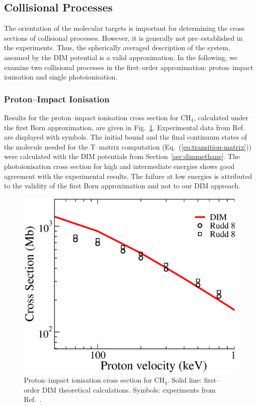 \documentclass[10pt]{article}
\begin{document}
\subsection{Collisional Processes}

The orientation of the molecular targets is important for determining
the cross sections of collisional processes. However, it is generally not 
pre--established in the experiments. Thus, the spherically averaged 
description of the system, 
assumed by the DIM potential is a valid approximation. In the 
following, we examine two collisional processes in the first--order 
approximation: proton--impact ionisation 
and single photoionisation. 

\subsubsection{Proton--Impact Ionisation}

Results for the proton--impact ionisation cross section for CH$_4$,
calculated under the first Born approximation, are given in 
Fig.~\ref{fig:ionch4}. 
Experimental data from Ref.~\cite{Rudd1983,Rudd1985} are displayed 
with symbols. The initial bound and the final continuum states 
of the molecule needed for the T--matrix computation 
(Eq.~(\ref{eq:transition-matrix})) were calculated 
with the DIM potentials from Section~\ref{sec:dimmethane}. 
The photoionisation cross section for high and intermediate energies
shows good agreement with the experimental results. The failure at
low energies is attributed to the validity of the first Born 
approximation and not to our DIM approach.

\begin{figure}[H]
\centering
\includegraphics[height=0.23\textheight]{figures/dimpot/born_ionch4.eps}
\caption{Proton--impact ionisation cross section for CH$_4$. Solid 
line: first--order DIM theoretical calculations. Symbols: experiments 
from Ref.~\cite{Rudd1983,Rudd1985}.}
\label{fig:ionch4}
\end{figure}
\end{document}
